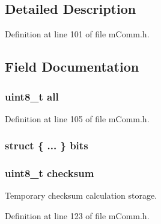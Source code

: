 \subsection{Detailed Description}


Definition at line 101 of file m\+Comm.\+h.



\subsection{Field Documentation}
\hypertarget{structm_comm___output_vector_af61f8246015db4f0a85a942ac747131e}{}
\subsubsection[{all}]{\setlength{\rightskip}{0pt plus 5cm}uint8\+\_\+t all}\label{structm_comm___output_vector_af61f8246015db4f0a85a942ac747131e}


Definition at line 105 of file m\+Comm.\+h.

\hypertarget{structm_comm___output_vector_a496ed1516daa851cd5ecfa9ca7f1bb54}{}
\subsubsection[{bits}]{\setlength{\rightskip}{0pt plus 5cm}struct \{ ... \}   bits}\label{structm_comm___output_vector_a496ed1516daa851cd5ecfa9ca7f1bb54}
\hypertarget{structm_comm___output_vector_a59eac9627282a484fbaf0aa7aa3b8a9a}{}
\subsubsection[{checksum}]{\setlength{\rightskip}{0pt plus 5cm}uint8\+\_\+t checksum}\label{structm_comm___output_vector_a59eac9627282a484fbaf0aa7aa3b8a9a}


Temporary checksum calculation storage. 



Definition at line 123 of file m\+Comm.\+h.

